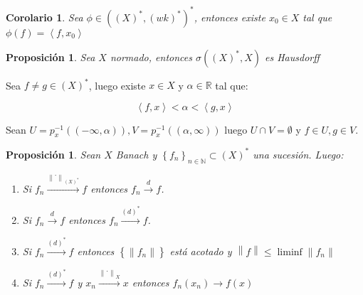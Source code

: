 \documentclass[11pt]{article}
\newcommand{\N}{{\mathbb{N}}}
\newcommand{\dual}[1]{\left(#1\right)^{\ast}}
\newcommand{\norm}[1]{\left\lVert#1\right\rVert}
\newcommand{\ip}[1]{\left\langle#1\right\rangle}
\newcommand{\sett}[1]{\left\lbrace#1\right\rbrace}
\numberwithin{theorem}{subsection}
\newtheorem{proposition}[theorem]{Proposici\'on}
\newtheorem{corollary}[theorem]{Corolario}
\newenvironment{proof}[1][Demostraci\'on]{\begin{trivlist}
		\item[\hskip \labelsep {\bfseries #1}]}{\end{trivlist}}
\newcommand{\qed}{\nobreak \ifvmode \relax \else
	\ifdim\lastskip<1.5em \hskip-\lastskip
	\hskip1.5em plus0em minus0.5em \fi \nobreak
	\vrule height0.75em width0.5em depth0.25em\fi}
\begin{document}
\begin{corollary}
	Sea $\phi \in \dual{\dual{X}, \dual{wk}}$, entonces existe $x_0 \in X$ tal que $\phi(f) = \ip{f,x_0}$
\end{corollary}

\begin{proposition}
	\label{Topologia debil estrella es Hausdorff}
	Sea $X$ normado, entonces $\sigma(\dual{X},X)$ es Hausdorff	
\end{proposition}

\begin{proof}
	Sea $f \neq g \in \dual{X}$, luego existe $x \in X$ y $\alpha \in \mathbb{R}$ tal que:
	
	
	\begin{equation*}
	\ip{f, x} < \alpha < \ip{g,x}
	\end{equation*}
	
	Sean $U = p_x^{-1}(\left(-\infty, \alpha\right)), V = p_x^{-1}(\left(\alpha, \infty\right))$ luego $U \cap V = \emptyset$ y $f \in U, g \in V$. \qed
	
\end{proof}

\begin{proposition}
	\label{Resultados de convergencia debil estrella}
	Sean $X$ Banach y $\sett{f_n}_{n \in \N} \subset \dual{X}$ una sucesi\'on. Luego:
	
	
	\begin{enumerate}
		\item Si $f_n \xrightarrow{\norm{.}_{\dual{X}}} f$ entonces $f_n \xrightarrow{d} f$.
		\item Si $f_n \xrightarrow{d} f$ entonces $f_n \xrightarrow{\dual{d}} f$.
		\item Si $f_n \xrightarrow{\dual{d}} f$ entonces $\sett{\norm{f_n}}$ est\'a acotado y $\norm{f} \leq \liminf \norm{f_n}$
		\item Si $f_n \xrightarrow{\dual{d}} f$  y $x_n \xrightarrow{\norm{.}_{X}} x$ entonces $f_n(x_n) \rightarrow f(x)$
	\end{enumerate}
	
\end{proposition}
\end{document}

